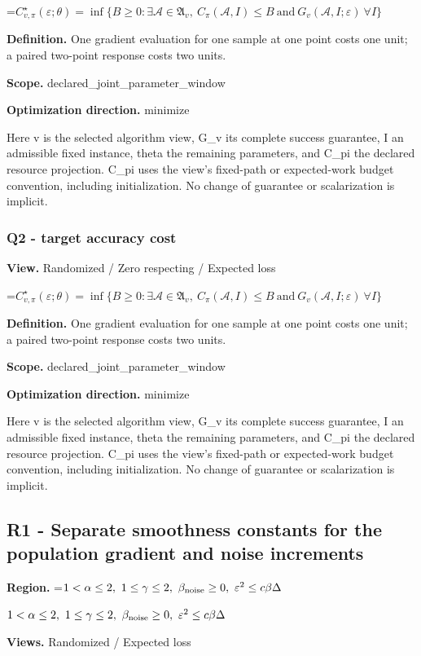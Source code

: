 \documentclass[10pt,a4paper]{article}
\newcommand{\AtlasMath}[1]{\par\begingroup\centering\setbox0=\hbox{$\displaystyle #1$}\ifdim\wd0>1.4\linewidth\typeout{ATLAS WIDE FORMULA: \the\wd0}\fi\ifdim\wd0>\linewidth\resizebox{\linewidth}{!}{\box0}\else\box0\fi\par\endgroup}
\newcommand{\AtlasInlineMath}[1]{\begingroup\setbox0=\hbox{$#1$}\ifdim\wd0>.4\linewidth\endgroup\AtlasMath{#1}\else\endgroup$#1$\fi}
\begin{document}
\AtlasMath{C^\star_{v,\pi}(\varepsilon;\theta)=\inf\{B\ge0:\exists\mathcal A\in\mathfrak A_v,\ C_\pi(\mathcal A,I)\le B\ \text{and}\ G_v(\mathcal A,I;\varepsilon)\ \forall I\}}
\textbf{Definition.} One gradient evaluation for one sample at one point costs one unit; a paired two-point response costs two units.

\textbf{Scope.} declared\_joint\_parameter\_window

\textbf{Optimization direction.} minimize

Here v is the selected algorithm view, G\_v its complete success guarantee, I an admissible fixed instance, theta the remaining parameters, and C\_pi the declared resource projection. C\_pi uses the view's fixed-path or expected-work budget convention, including initialization. No change of guarantee or scalarization is implicit.

\subsubsection{Q2 - target accuracy cost}
\textbf{View.} Randomized / Zero respecting / Expected loss

\AtlasMath{C^\star_{v,\pi}(\varepsilon;\theta)=\inf\{B\ge0:\exists\mathcal A\in\mathfrak A_v,\ C_\pi(\mathcal A,I)\le B\ \text{and}\ G_v(\mathcal A,I;\varepsilon)\ \forall I\}}
\textbf{Definition.} One gradient evaluation for one sample at one point costs one unit; a paired two-point response costs two units.

\textbf{Scope.} declared\_joint\_parameter\_window

\textbf{Optimization direction.} minimize

Here v is the selected algorithm view, G\_v its complete success guarantee, I an admissible fixed instance, theta the remaining parameters, and C\_pi the declared resource projection. C\_pi uses the view's fixed-path or expected-work budget convention, including initialization. No change of guarantee or scalarization is implicit.

\subsection{R1 - Separate smoothness constants for the population gradient and noise increments}
\textbf{Region.} \AtlasInlineMath{1<\alpha\le2,\ 1\le\gamma\le2,\ \beta_{\rm noise}\ge0,\ \varepsilon^2\le c\beta\Delta}

\textbf{Views.} Randomized / Expected loss
\end{document}
